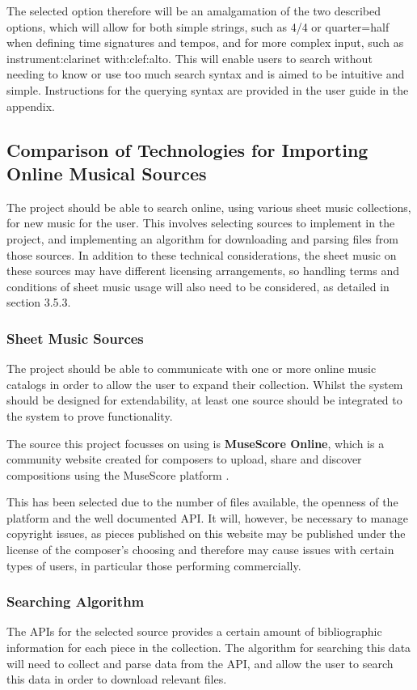The selected option therefore will be an amalgamation of the two described options, which will allow for both simple strings, such as 4/4 or quarter=half when defining time signatures and tempos, and for more complex input, such as instrument:clarinet with:clef:alto. This will enable users to search without needing to know or use too much search syntax and is aimed to be intuitive and simple. Instructions for the querying syntax are provided in the user guide in the appendix.



\subsection{Comparison of Technologies for Importing Online Musical Sources}
The project should be able to search online, using various sheet music collections, for new music for the user. This involves selecting sources to implement in the project, and implementing an algorithm for downloading and parsing files from those sources. In addition to these technical considerations, the sheet music on these sources may have different licensing arrangements, so handling terms and conditions of sheet music usage will also need to be considered, as detailed in section 3.5.3.
\subsubsection{Sheet Music Sources}
The project should be able to communicate with one or more online music catalogs in order to allow the user to expand their collection. Whilst the system should be designed for extendability, at least one source should be integrated to the system to prove functionality.

The source this project focusses on using is \textbf{MuseScore Online}, which is a community website created for composers to upload, share and discover compositions using the MuseScore platform \parencite{MuseShare}.

This has been selected due to the number of files available, the openness of the platform and the well documented API. It will, however, be necessary to manage copyright issues, as pieces published on this website may be published under the license of the composer's choosing and therefore may cause issues with certain types of users, in particular those performing commercially.

\subsubsection{Searching Algorithm}
The APIs for the selected source provides a certain amount of bibliographic information for each piece in the collection. The algorithm for searching this data will need to collect and parse data from the API, and allow the user to search this data in order to download relevant files.


